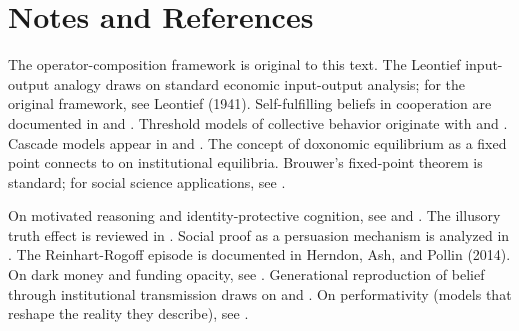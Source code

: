 \begin{center}
\end{center}


\section{Notes and References}
\label{sec:ch5-notes}

The operator-composition framework is original to this text.
The Leontief input-output analogy draws on standard economic input-output analysis; for the original framework, see Leontief (1941).
Self-fulfilling beliefs in cooperation are documented in \textcite{fischbacher2001} and \textcite{henrich2001}.
Threshold models of collective behavior originate with \textcite{granovetter1978} and \textcite{schelling1978}.
Cascade models appear in \textcite{banerjee1992} and \textcite{bikhchandani1992}.
The concept of doxonomic equilibrium as a fixed point connects to \textcite{north1990} on institutional equilibria.
Brouwer's fixed-point theorem is standard; for social science applications, see \textcite{jackson2008}.

On motivated reasoning and identity-protective cognition, see \textcite{kahan2012} and \textcite{mercier2017}.
The illusory truth effect is reviewed in \textcite{kahneman2011}.
Social proof as a persuasion mechanism is analyzed in \textcite{cialdini2006}.
The Reinhart-Rogoff episode is documented in Herndon, Ash, and Pollin (2014).
On dark money and funding opacity, see \textcite{mayer2016}.
Generational reproduction of belief through institutional transmission draws on \textcite{bourdieu1984} and \textcite{bowles1976}.
On performativity (models that reshape the reality they describe), see \textcite{mackenzie2006}.

